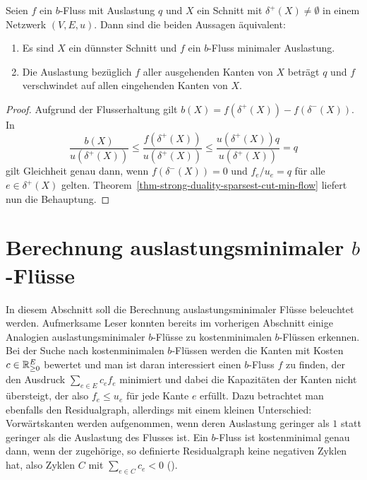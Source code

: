 \begin{corollary}\label{cor-easy-characterization-sparsest-cut}
	Seien $f$ ein $b$-Fluss mit Auslastung $q$ und $X$ ein Schnitt mit $\delta^+(X)\neq \emptyset$ in einem Netzwerk $(V, E, u)$.
	Dann sind die beiden Aussagen äquivalent:
	\begin{enumerate}[label=(\roman*)]
		\item Es sind $X$ ein dünnster Schnitt und $f$ ein $b$-Fluss minimaler Auslastung.
		\item Die Auslastung bezüglich $f$ aller ausgehenden Kanten von $X$ beträgt $q$ und $f$ verschwindet auf allen eingehenden Kanten von $X$.
	\end{enumerate}
\end{corollary}
\begin{proof}
	Aufgrund der Flusserhaltung gilt $b(X) = f(\delta^+(X)) - f(\delta^-(X))$.
	In \[
	\frac{b(X)}{u(\delta^+(X))} \leq \frac{f(\delta^+(X))}{u(\delta^+(X))} \leq \frac{u(\delta^+(X)) q}{u(\delta^+(X))} = q
	\]
	gilt Gleichheit genau dann, wenn $f(\delta^-(X))=0$ und $f_{e}/u_{e} = q$ für alle $e\in\delta^+(X)$ gelten.
	Theorem~\ref{thm-strong-duality-sparsest-cut-min-flow} liefert nun die Behauptung.
\end{proof}


\section{Berechnung auslastungsminimaler $b$-Flüsse}

In diesem Abschnitt soll die Berechnung auslastungsminimaler Flüsse beleuchtet werden.
Aufmerksame Leser konnten bereits im vorherigen Abschnitt einige Analogien auslastungsminimaler $b$-Flüsse zu kostenminimalen $b$-Flüssen erkennen.
Bei der Suche nach kostenminimalen $b$-Flüssen werden die Kanten mit Kosten $c\in\mathbb{R}_{\geq 0}^E$ bewertet und man ist daran interessiert einen $b$-Fluss $f$ zu finden, der den Ausdruck $\sum_{e \in E} c_e f_e$ minimiert und dabei die Kapazitäten der Kanten nicht übersteigt, der also $f_e \leq u_e$ für jede Kante $e$ erfüllt.
Dazu betrachtet man ebenfalls den Residualgraph, allerdings mit einem kleinen Unterschied: Vorwärtskanten werden aufgenommen, wenn deren Auslastung geringer als $1$ statt geringer als die Auslastung des Flusses ist.
Ein $b$-Fluss ist kostenminimal genau dann, wenn der zugehörige, so definierte Residualgraph keine negativen Zyklen hat, also Zyklen $C$ mit $\sum_{e\in C} c_e < 0$ ().

